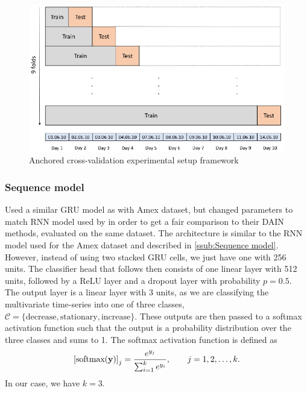 \documentclass{statsmsc}
\begin{document}
{%
\begin{figure}
\begin{center}
    \includegraphics[width=\textwidth]{diagrams/lob_cross_val_diagram.pdf}
\end{center}
\caption{Anchored cross-validation experimental setup framework}
\label{fig:lob_anchor}
\end{figure}

\subsubsection{Sequence model}%
\label{ssub:Sequencemodel2}

Used a similar \ac{GRU} model as with Amex dataset, but changed parameters to match \ac{RNN}
model used by \cite{dain} in order to get a fair comparison to their \ac{DAIN} methods, evaluated
on the same dataset. The architecture is  similar to the \ac{RNN} model used for the Amex dataset
and described in \cref{ssub:Sequence model}. However, instead of using two stacked \ac{GRU} cells,
we just have one with 256 units. The classifier head that follows then consists of one linear
layer with 512 units, followed by a \ac{ReLU} layer and a dropout layer with probability $p=0.5$.
The output layer is
a linear layer with 3 units, as we are classifying the multivariate time-series into one of
three classes, $\mathcal{C}=\{\textrm{decrease}, \textrm{stationary}, \textrm{increase}\}$.
These outputs are then passed to a softmax activation function such that the
output is a probability distribution over the three classes and sums to 1.
The softmax activation function is defined as
\begin{equation}
    \left[\textrm{softmax}(\mathbf{y})\right]_j=\frac{e^{y_j}}{\sum^{k}_{i=1} e^{y_i}} ,\qquad j=1,2,\dots,k.
\end{equation}
In our case, we have $k=3$.

}
\end{document}
